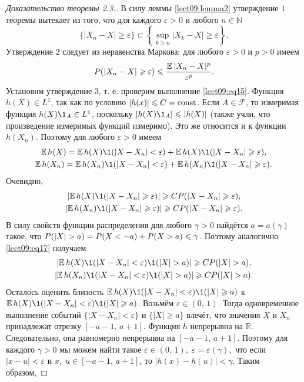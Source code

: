 \begin{proof}[Доказательство теоремы 2.3.]
В силу леммы \ref{lect09:lemma2} утверждение $1$ теоремы вытекает из того, что для каждого $\varepsilon>0$ и любого $n\in\mathbb{N}$
\[ \{|X_n-X|\geqslant\varepsilon\}\subset\left\{\sup_{k\geqslant n}|X_k-X|\geqslant\varepsilon\right\}. \]
Утверждение $2$ следует из неравенства Маркова: для любого $\varepsilon>0$ и $p>0$ имеем
\[ 
P(|X_n-X|\geqslant\varepsilon)\leqslant\dfrac{\operatorname*{\mathbb{E}}|X_n-X|^p}{\varepsilon^p}. \]
Установим утверждение $3$, т. е. проверим выполнение \ref{lect09:eq15}. Функция $h(X)\in L^1$, так как по условию $|h(x)|\leqslant C=\textnormal{const}$. Если $A\in\mathcal{F}$, то измеримая функция $h(X)\1_A\in L^1$, поскольку $|h(X)\1_A|\leqslant|h(X)|$ (также учли, что произведение измеримых функций измеримо). Это же относится и к функции $h(X_n)$. Поэтому для любого $\varepsilon>0$ имеем
\begin{multline*}
 \E h(X)=\E h(X)\1(|X-X_n|<\varepsilon)+\E h(X)\1(|X-X_n|\geqslant\varepsilon),\\
 \E h(X_n)=\E h(X_n)\1(|X-X_n|<\varepsilon)+\E h(X_n)\1(|X-X_n|\geqslant\varepsilon).
\end{multline*}
Очевидно,
\begin{multline}\label{lect09:eq17}
\left|\E h(X)\1(|X-X_n|\geqslant\varepsilon)\right|\geqslant C\P(|X-X_n|\geqslant\varepsilon),\\ \left|\E h(X_n)\1(|X-X_n|\geqslant\varepsilon)\right|\geqslant C\P(|X-X_n|\geqslant\varepsilon).
\end{multline}
В силу свойств функции распределения для любого $\gamma>0$ найдётся $a=a(\gamma)$ такое, что $\P(|X|>a)=\P(X<-a)+\P(X>a)\leqslant\gamma$. Поэтому аналогично \ref{lect09:eq17} получаем
\begin{multline*}
\left|\E h(X)\1(|X-X_n|<\varepsilon)\1(|X|>a)\right|\geqslant CP(|X|>a),\\\left|\E h(X_n)\1(|X-X_n|<\varepsilon)\1(|X|>a)\right|\geqslant CP(|X|>a). 
\end{multline*}
Осталось оценить близость $\E h(X)\1(|X-X_n|<\varepsilon)\1(|X|\geqslant a)$ к $\E h(X)\1(|X-X_n|<\varepsilon)\1(|X|\geqslant a)$. Возьмём $\varepsilon\in(0,\,1)$. Тогда одновременное выполнение событий $\{|X-X_n|<\varepsilon\}$ и $\{|X|\geqslant a\}$ влечёт, что значения $X$ и $X_n$ принадлежат отрезку $[-a-1,\,a+1]$. Функция $h$ непрерывна на $\mathbb{R}$. Следовательно, она равномерно непрерывна на $[-a-1,\,a+1]$. Поэтому для каждого $\gamma>0$ мы можем найти такое $\varepsilon\in(0,\,1),\;\varepsilon=\varepsilon(\gamma),$ что если $|x-u|<\varepsilon$ и $x,\;u\in[-a-1,\,a+1]$, то $|h(x)-h(u)|<\gamma$. Таким образом,

\end{proof}
